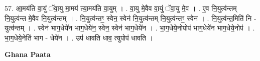 \documentclass[17pt]{extarticle}
\begin{document}
57. आ॒मय॑ति वा॒युं ॅवा॒यु मा॒मय॑ त्या॒मय॑ति वा॒युम् । . वा॒यु मे॒वैव वा॒युं ॅवा॒यु मे॒व । . ए॒व नि॒युत्व॑न्तम् नि॒युत्व॑न्त मे॒वैव नि॒युत्व॑न्तम् । . नि॒युत्व॑न्तꣳ॒॒ स्वेन॒ स्वेन॑ नि॒युत्व॑न्तम् नि॒युत्व॑न्तꣳ॒॒ स्वेन॑ । . नि॒युत्व॑न्त॒मिति॑ नि - युत्व॑न्तम् । . स्वेन॑ भाग॒धेये॑न भाग॒धेये॑न॒ स्वेन॒ स्वेन॑ भाग॒धेये॑न । . भा॒ग॒धेये॒नोपोप॑ भाग॒धेये॑न भाग॒धेये॒नोप॑ । . भा॒ग॒धेये॒नेति॑ भाग - धेये॑न । . उप॑ धावति धाव॒ त्युपोप॑ धावति । \newline

\textbf{Ghana Paata } \newline
\end{document}
